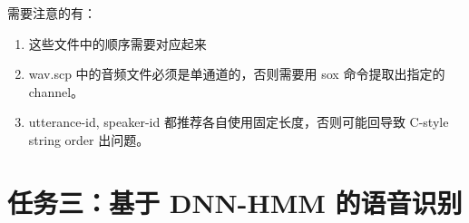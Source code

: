 \documentclass[degree=project, degree-type=project]{thuthesis}
\begin{document}
需要注意的有：

\begin{enumerate}
  \item 这些文件中的顺序需要对应起来
  \item wav.scp 中的音频文件必须是单通道的，否则需要用 sox 命令提取出指定的 channel。
  \item utterance-id, speaker-id 都推荐各自使用固定长度，否则可能回导致 C-style string order 出问题。
\end{enumerate}

\chapter{任务三：基于 DNN-HMM 的语音识别}

\backmatter


\appendix
\end{document}
